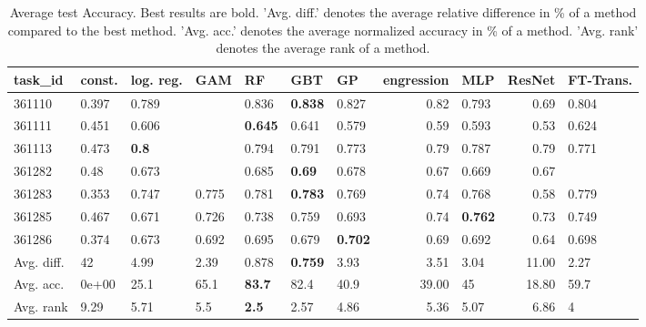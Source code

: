 \begin{table}[ht!]
\centering
\begingroup\footnotesize
\begin{tabular}{lllllllrlrl}
  \hline
\hline
task\_id & const. & log. reg. & GAM & RF & GBT & GP & engression & MLP & ResNet & FT-Trans. \\ 
  \hline
361110 & 0.397 & 0.789 &  & 0.836 & \textbf{0.838} & 0.827 & 0.82 & 0.793 & 0.69 & 0.804 \\ 
  361111 & 0.451 & 0.606 &  & \textbf{0.645} & 0.641 & 0.579 & 0.59 & 0.593 & 0.53 & 0.624 \\ 
  361113 & 0.473 & \textbf{0.8} &  & 0.794 & 0.791 & 0.773 & 0.79 & 0.787 & 0.79 & 0.771 \\ 
  361282 & 0.48 & 0.673 &  & 0.685 & \textbf{0.69} & 0.678 & 0.67 & 0.669 & 0.67 &  \\ 
  361283 & 0.353 & 0.747 & 0.775 & 0.781 & \textbf{0.783} & 0.769 & 0.74 & 0.768 & 0.58 & 0.779 \\ 
  361285 & 0.467 & 0.671 & 0.726 & 0.738 & 0.759 & 0.693 & 0.74 & \textbf{0.762} & 0.73 & 0.749 \\ 
  361286 & 0.374 & 0.673 & 0.692 & 0.695 & 0.679 & \textbf{0.702} & 0.69 & 0.692 & 0.64 & 0.698 \\ 
   \hline
Avg. diff. & 42 & 4.99 & 2.39 & 0.878 & \textbf{0.759} & 3.93 & 3.51 & 3.04 & 11.00 & 2.27 \\ 
  Avg. acc. & 0e+00 & 25.1 & 65.1 & \textbf{83.7} & 82.4 & 40.9 & 39.00 & 45 & 18.80 & 59.7 \\ 
  Avg. rank & 9.29 & 5.71 & 5.5 & \textbf{2.5} & 2.57 & 4.86 & 5.36 & 5.07 & 6.86 & 4 \\ 
   \hline
\hline
\end{tabular}
\endgroup
\caption{Average test Accuracy. 
                  Best results are bold. 
                  'Avg. diff.' denotes the average relative difference in \% of a method compared to the best method.
                  'Avg. acc.' denotes the average normalized accuracy in \% of a method.
                  'Avg. rank' denotes the average rank of a method.} 
\label{TABLES/table_results_Accuracy_gower_num_and_cat_features}
\end{table}
